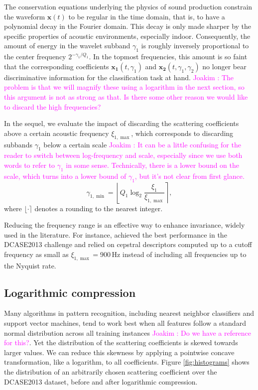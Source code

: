 \documentclass[journal]{IEEEtran}
\newcommand{\ja}[1]{\textcolor{magenta}{Joakim : #1}}
\begin{document}
The conservation equations underlying the physics of sound production constrain the waveform $\boldsymbol{x}(t)$ to be regular in the time domain, that is, to have a polynomial decay in the Fourier domain.
This decay is only made sharper by the specific properties of acoustic environments, especially indoor.
Consequently, the amount of energy in the wavelet subband $\gamma_1$ is roughly inversely proportional to the center frequency $2^{-\gamma_1/Q_1}$.
In the topmost frequencies, this amount is so faint that the corresponding coefficients $\boldsymbol{x_1}(t,\gamma_1)$ and $\boldsymbol{x_2}(t,\gamma_1,\gamma_2)$ no longer bear discriminative information for the classification task at hand. \ja{The problem is that we will magnify these using a logarithm in the next section, so this argument is not as strong as that. Is there some other reason we would like to discard the high frequencies?}

In the sequel, we evaluate the impact of discarding the scattering coefficients above a certain acoustic frequency $\xi_{1,\max}$, which corresponds to discarding subbands $\gamma_1$ below a certain scale \ja{It can be a little confusing for the reader to switch between log-frequency and scale, especially since we use both words to refer to $\gamma_1$ in some sense. Technically, there is a lower bound on the scale, which turns into a lower bound of $\gamma_1$, but it's not clear from first glance.}
\begin{equation}
\gamma_{1,\min} =
\left\lfloor Q_1 \log_2 \frac{\xi_1}{\xi_{1,\max}} \right\rceil,
\end{equation}
where $\lfloor \cdot \rceil$ denotes a rounding to the nearest integer.

Reducing the frequency range is an effective way to enhance invariance, widely used in the literature.
For instance, \cite{roma2013} achieved the best performance in the DCASE2013 challenge and relied on cepstral descriptors computed up to a cutoff frequency as small as $\xi_{1,\max} = 900\,\mathrm{Hz}$ instead of including all frequencies up to the Nyquist rate.

\subsection{Logarithmic compression}
\label{sec:logcomp}

Many algorithms in pattern recognition, including nearest neighbor classifiers and support vector machines, tend to work best when all features follow a standard normal distribution across all training instances \ja{Do we have a reference for this?}.
Yet the distribution of the scattering coefficients is skewed towards larger values. We can reduce this skewness by applying a pointwise concave transformation, like a logarithm, to all coefficients.
Figure \ref{fig:histograms} shows the distribution of an arbitrarily chosen scattering coefficient over the DCASE2013 dataset, before and after logarithmic compression.
\end{document}
